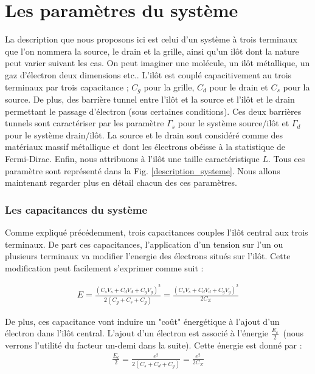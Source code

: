 \section{Les paramètres du système}
La description que nous proposons ici est celui d'un système à trois terminaux que l'on nommera la source, le drain et la grille, ainsi qu'un il\^ot dont la nature peut varier suivant les cas. On peut imaginer une molécule, un il\^ot métallique, un gaz d'électron deux dimensions etc.. L'il\^ot est couplé capacitivement au trois terminaux par trois capacitance ; $C_g$ pour la grille, $C_d$ pour le drain et $C_s$ pour la source. De plus, des barrière tunnel entre l'il\^ot et la source et l'il\^ot et le drain permettant le passage d'électron (sous certaines conditions). Ces deux barrières tunnels sont caractériser par les paramètre $\Gamma_s$ pour le système source/il\^ot et $\Gamma_d$ pour le système drain/il\^ot. La source et le drain sont considéré comme des matériaux massif métallique et dont les électrons obéisse à la statistique de Fermi-Dirac. Enfin, nous attribuons à l'il\^ot une taille caractéristique $L$. Tous ces paramètre sont représenté dans la Fig. \ref{description_systeme}. Nous allons maintenant regarder plus en détail chacun des ces paramètres.

\subsubsection{Les capacitances du système}
Comme expliqué précédemment, trois capacitances couples l'il\^ot central aux trois terminaux. De part ces capacitances, l'application d'un tension sur l'un ou plusieurs terminaux va modifier l'energie des électrons situés sur l'ilôt. Cette modification peut facilement s'exprimer comme suit :

\begin{eqnarray}
E = \frac{(C_sV_s + C_dV_d + C_gV_g)^2}{2(C_g + C_s + C_g)}=\frac{(C_sV_s + C_dV_d + C_gV_g)^2}{2C_{\Sigma}} \nonumber
\end{eqnarray}

De plus, ces capacitance vont induire un "co\^ut" énergétique à l'ajout d'un électron dans l'il\^ot central. L'ajout d'un électron est associé à l'énergie $\frac{E_c}{2}$~(nous verrons l'utilité du facteur un-demi dans la suite). Cette énergie est donné par :
\begin{eqnarray}
\frac{E_c}{2} = \frac{e^2}{2(C_s+C_d+C_g)}=\frac{e^2}{2C_{\Sigma}} \nonumber
\end{eqnarray}


